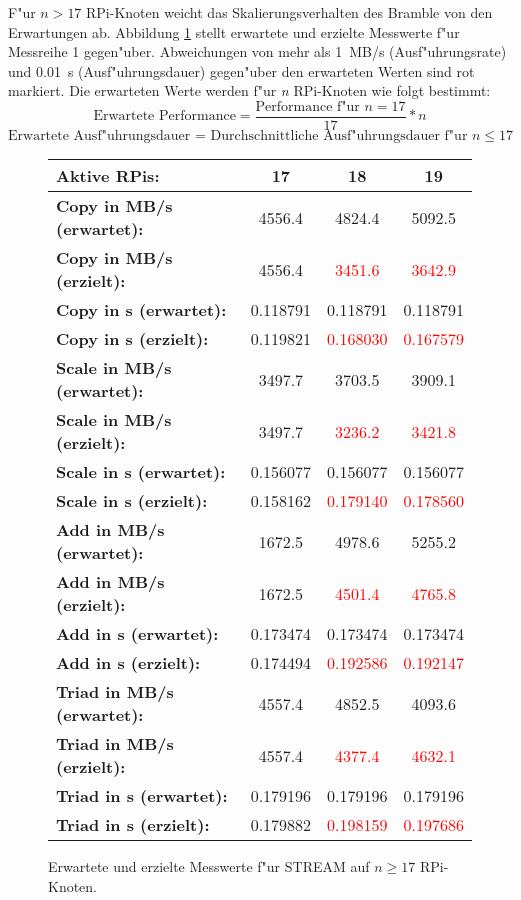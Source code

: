 F"ur $n > 17$ RPi-Knoten weicht das Skalierungsverhalten des Bramble von den Erwartungen ab. Abbildung \ref{fig:stream-abweichung} stellt erwartete und erzielte Messwerte f"ur Messreihe 1 gegen"uber. Abweichungen von mehr als 1~MB/s (Ausf"uhrungsrate) und 0.01~s (Ausf"uhrungsdauer) gegen"uber den erwarteten Werten sind rot markiert. Die erwarteten Werte werden f"ur \textit{n} RPi-Knoten wie folgt bestimmt: 
\[\text{Erwartete Performance} = \frac{\text{Performance f"ur }n=17}{17}\ast n\] 
\[\text{Erwartete Ausf"uhrungsdauer = Durchschnittliche Ausf"uhrungsdauer f"ur }n\leq 17\]
\begin{figure}[H]
  \centering
  \begin{tabular}{|l|c|c|c|}
    \hline 
    \textbf{Aktive RPis:} & \textbf{17} & \textbf{18} & \textbf{19}\\ 
    \hline 
    \textbf{Copy in MB/s (erwartet):} & 4556.4 & 4824.4 & 5092.5\\
    \hline 
    \textbf{Copy in MB/s (erzielt):} & 4556.4 & \textcolor{red}{3451.6} & \textcolor{red}{3642.9}\\
    \hline 
    \textbf{Copy in s (erwartet):} & 0.118791 & 0.118791 & 0.118791\\
    \hline 
    \textbf{Copy in s (erzielt):} & 0.119821 & \textcolor{red}{0.168030} & \textcolor{red}{0.167579}\\
    \hline 
    \textbf{Scale in MB/s (erwartet):} & 3497.7 & 3703.5 & 3909.1\\
    \hline 
    \textbf{Scale in MB/s (erzielt):} & 3497.7 & \textcolor{red}{3236.2} & \textcolor{red}{3421.8}\\
    \hline 
	\textbf{Scale in s (erwartet):} & 0.156077 & 0.156077 & 0.156077\\
    \hline 
    \textbf{Scale in s (erzielt):} & 0.158162 & \textcolor{red}{0.179140} & \textcolor{red}{0.178560}\\
    \hline 
    \textbf{Add in MB/s (erwartet):} & 1672.5 & 4978.6 & 5255.2\\
    \hline 
    \textbf{Add in MB/s (erzielt):} & 1672.5 & \textcolor{red}{4501.4} & \textcolor{red}{4765.8}\\
    \hline 
    \textbf{Add in s (erwartet):} & 0.173474 & 0.173474 & 0.173474\\
    \hline 
    \textbf{Add in s (erzielt):} & 0.174494 & \textcolor{red}{0.192586} & \textcolor{red}{0.192147}\\
    \hline 
    \textbf{Triad in MB/s (erwartet):} & 4557.4 & 4852.5 & 4093.6\\
    \hline 
    \textbf{Triad in MB/s (erzielt):} & 4557.4 & \textcolor{red}{4377.4} & \textcolor{red}{4632.1}\\
    \hline 
    \textbf{Triad in s (erwartet):} & 0.179196 & 0.179196 & 0.179196\\
    \hline 
    \textbf{Triad in s (erzielt):} & 0.179882 & \textcolor{red}{0.198159} & \textcolor{red}{0.197686}\\
    \hline 
  \end{tabular}
  \caption{Erwartete und erzielte Messwerte f"ur STREAM auf $n\geq 17$ RPi-Knoten.}\label{fig:stream-abweichung}
\end{figure}
